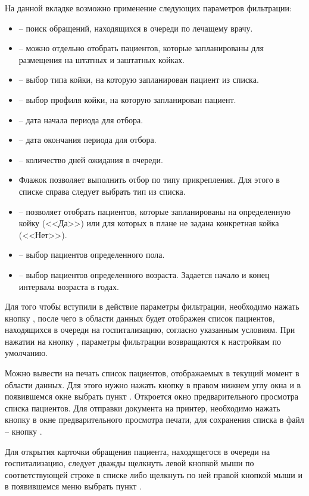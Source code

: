 На данной вкладке возможно применение следующих параметров фильтрации:
\begin{itemize}
 \item {} – поиск обращений, находящихся в очереди по лечащему врачу.
 \item {} – можно отдельно отобрать пациентов, которые запланированы для размещения на штатных и заштатных койках.
 \item {} – выбор типа койки, на которую запланирован пациент из списка.
 \item {} – выбор профиля койки, на которую запланирован пациент.
 \item {} – дата начала периода для отбора.
 \item {} – дата окончания периода для отбора.
 \item {} – количество дней ожидания в очереди.
 \item Флажок  позволяет выполнить отбор по типу прикрепления. Для этого в списке справа следует выбрать тип из списка.
 \item {} – позволяет отобрать пациентов, которые запланированы на определенную койку (<<Да>>) или для которых в плане не задана конкретная койка (<<Нет>>).
 \item {} – выбор пациентов определенного пола.
 \item {} – выбор пациентов определенного возраста. Задается начало и конец интервала возраста в годах.
\end{itemize}

Для того чтобы вступили в действие параметры фильтрации, необходимо нажать кнопку , после чего в области данных будет отображен список пациентов, находящихся в очереди на госпитализацию, согласно указанным условиям. При нажатии на кнопку , параметры фильтрации возвращаются к настройкам по умолчанию.

Можно вывести на печать список пациентов, отображаемых в текущий момент в области данных. Для этого нужно нажать кнопку  в правом нижнем углу окна и в появившемся окне выбрать пункт . Откроется окно предварительного просмотра списка пациентов. Для отправки документа на принтер, необходимо нажать кнопку  в окне предварительного просмотра печати, для сохранения списка в файл – кнопку .

Для открытия карточки обращения пациента, находящегося в очереди на госпитализацию, следует дважды щелкнуть левой кнопкой мыши по соответствующей строке в списке либо щелкнуть по ней правой кнопкой мыши и в появившемся меню выбрать пункт .

